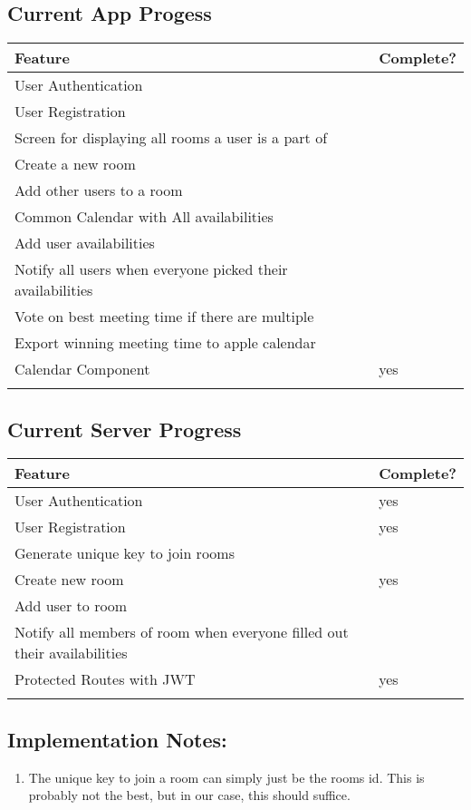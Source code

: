 \documentclass[11pt]{article}
\begin{document}
\subsection{Current App Progess}
\label{sec:orgc38b96c}

\begin{center}
\begin{tabular}{ll}
Feature & Complete?\\
\hline
User Authentication & \\
User Registration & \\
Screen for displaying all rooms a user is a part of & \\
Create a new room & \\
Add other users to a room & \\
Common Calendar with All availabilities & \\
Add user availabilities & \\
Notify all users when everyone picked their availabilities & \\
Vote on best meeting time if there are multiple & \\
Export winning meeting time to apple calendar & \\
Calendar Component & yes\\
 & \\
\end{tabular}
\end{center}


\subsection{Current Server Progress}
\label{sec:orgb245bbb}

\begin{center}
\begin{tabular}{ll}
Feature & Complete?\\
\hline
User Authentication & yes\\
User Registration & yes\\
Generate unique key to join rooms & \\
Create new room & yes\\
Add user to room & \\
Notify all members of room when everyone filled out their availabilities & \\
Protected Routes with JWT & yes\\
 & \\
\end{tabular}
\end{center}


\subsection{Implementation Notes:}
\label{sec:org1e9b76e}

\begin{enumerate}
\item The unique key to join a room can simply just be the rooms id. This is probably not the best, but in our case, this should suffice.
\end{enumerate}
\end{document}
